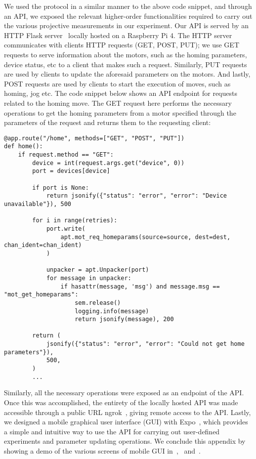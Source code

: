 \noindent
We used the protocol in a similar manner to the above code snippet, and through an \gls{API}, we exposed the relevant higher-order functionalities required to carry out the various projective measurements in our experiment. Our \acs{API} is served by an HTTP Flask server~\cite{flask} locally hosted on a Raspberry Pi 4. The HTTP server communicates with clients \via HTTP requests (GET, POST, PUT); we use GET requests to serve information about the motors, such as the homing parameters, device status, etc to a client that makes such a request. Similarly, PUT requests are used by clients to update the aforesaid parameters on the motors. And lastly, POST requests are used by clients to start the execution of moves, such as homing, jog etc. The code snippet below shows an \acs{API} endpoint for requests related to the homing move. The GET request here performs the necessary operations to get the homing parameters from a motor specified through the parameters of the request and returns them to the requesting client:


\begin{verbatim}
@app.route("/home", methods=["GET", "POST", "PUT"])
def home():
    if request.method == "GET":
        device = int(request.args.get("device", 0))
        port = devices[device]

        if port is None:
            return jsonify({"status": "error", "error": "Device unavailable"}), 500

        for i in range(retries):
            port.write(
                apt.mot_req_homeparams(source=source, dest=dest, chan_ident=chan_ident)
            )

            unpacker = apt.Unpacker(port)
            for message in unpacker:
                if hasattr(message, 'msg') and message.msg == "mot_get_homeparams":
                    sem.release()
                    logging.info(message)
                    return jsonify(message), 200

        return (
            jsonify({"status": "error", "error": "Could not get home parameters"}),
            500,
        )
        ...
\end{verbatim}

\noindent
Similarly, all the necessary operations were exposed as an endpoint of the API. Once this was accomplished, the entirety of the locally hosted \acs{API} was made accessible through a public URL \via ngrok~\cite{ngrok}, giving remote access to the API. Lastly, we designed a mobile graphical user interface (GUI) with Expo~\cite{expo}, which provides a simple and intuitive way to use the \acs{API} for carrying out user-defined experiments and parameter updating operations. We conclude this appendix by showing a demo of the various screens of mobile GUI in~,~ and~.

